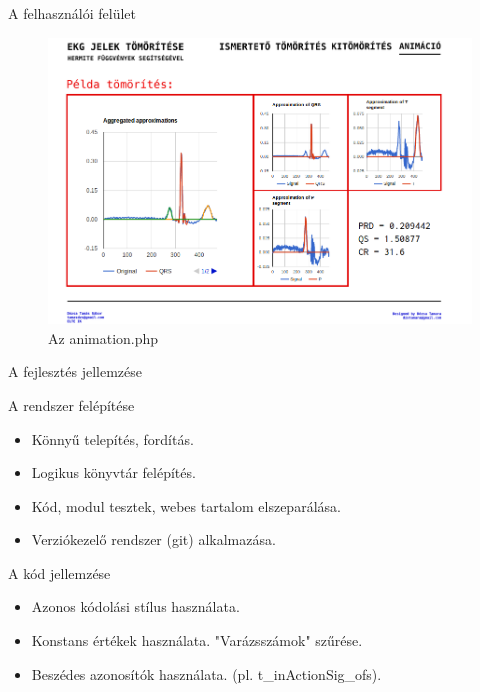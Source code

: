 \documentclass{beamer}
\begin{document}
\begin{frame}{A felhasználói felület}
\linespread{0.8}
\small
\vspace{-2mm}

\begin{figure}[H]
\begin{center}
   \includegraphics[scale=0.25]{./figures/animpage.png}
   \caption{Az animation.php}
\end{center}
\end{figure}

\end{frame}


\begin{frame}{A fejlesztés jellemzése}
\linespread{0.8}
\small
\vspace{-2mm}
\begin{block}{A rendszer felépítése}
	\begin{itemize}
		\item Könnyű telepítés, fordítás.
		\item Logikus könyvtár felépítés. 
		\item Kód, modul tesztek, webes tartalom elszeparálása.
		\item Verziókezelő rendszer (git) alkalmazása.
	\end{itemize}
	\end{block}		
	
\begin{block}{A kód jellemzése}
	\begin{itemize}
		\item Azonos kódolási stílus használata. 
		\item Konstans értékek használata. "Varázsszámok" szűrése.
		\item Beszédes azonosítók használata. (pl. t\_inActionSig\_ofs).
	\end{itemize}
	\end{block}
\end{frame}
\end{document}
